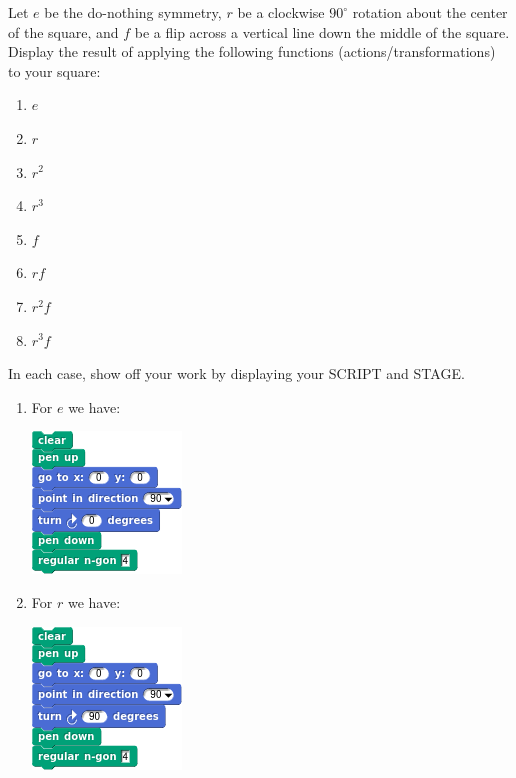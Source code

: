 \documentclass[noauthor,nooutcomes,12pt,hints,handout]{ximera}
\begin{document}
\begin{question}
  Let $e$ be the do-nothing symmetry, $r$ be a clockwise $90^\circ$
  rotation about the center of the square, and $f$ be a flip across
  a vertical line down the middle of the square. Display the result
  of applying the following functions (actions/transformations) to
  your square:
  \begin{enumerate}
  \item $e$
  \item $r$
  \item $r^2$
  \item $r^3$
  \item $f$
  \item $rf$
  \item $r^2 f$
  \item $r^3 f$
  \end{enumerate}
  In each case, show off your work by displaying your SCRIPT and
  STAGE.
  \begin{freeResponse}
    \begin{enumerate}
    \item For $e$ we have:
      \begin{center}
        \includegraphics[width=.3\textwidth]{eSqSCRIPT.png}   \qquad {}
      \end{center}
    \item For $r$ we have:
      \begin{center}
        \includegraphics[width=.3\textwidth]{rSqSCRIPT.png}   \qquad {}

\end{center}
\end{enumerate}
\end{freeResponse}
\end{question}
\end{document}
